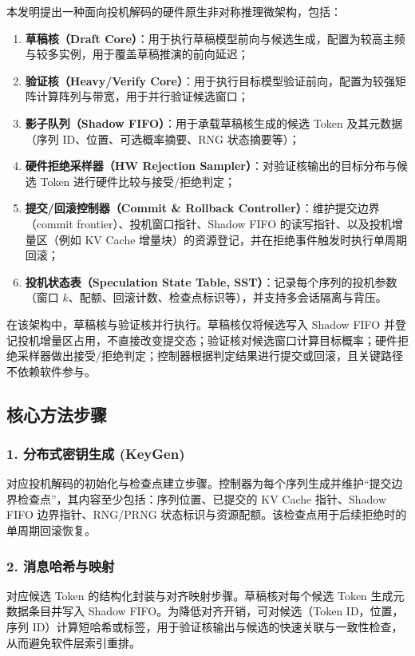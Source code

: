 \documentclass[12pt,a4paper]{article}
\begin{document}
本发明提出一种面向投机解码的硬件原生非对称推理微架构，包括：
\begin{enumerate}
    \item \textbf{草稿核（Draft Core）}：用于执行草稿模型前向与候选生成，配置为较高主频与较多实例，用于覆盖草稿推演的前向延迟；
    \item \textbf{验证核（Heavy/Verify Core）}：用于执行目标模型验证前向，配置为较强矩阵计算阵列与带宽，用于并行验证候选窗口；
    \item \textbf{影子队列（Shadow FIFO）}：用于承载草稿核生成的候选 Token 及其元数据（序列 ID、位置、可选概率摘要、RNG 状态摘要等）；
    \item \textbf{硬件拒绝采样器（HW Rejection Sampler）}：对验证核输出的目标分布与候选 Token 进行硬件比较与接受/拒绝判定；
    \item \textbf{提交/回滚控制器（Commit \& Rollback Controller）}：维护提交边界（commit frontier）、投机窗口指针、Shadow FIFO 的读写指针、以及投机增量区（例如 KV Cache 增量块）的资源登记，并在拒绝事件触发时执行单周期回滚；
    \item \textbf{投机状态表（Speculation State Table, SST）}：记录每个序列的投机参数（窗口 $k$、配额、回滚计数、检查点标识等），并支持多会话隔离与背压。
\end{enumerate}

在该架构中，草稿核与验证核并行执行。草稿核仅将候选写入 Shadow FIFO 并登记投机增量区占用，不直接改变提交态；验证核对候选窗口计算目标概率；硬件拒绝采样器做出接受/拒绝判定；控制器根据判定结果进行提交或回滚，且关键路径不依赖软件参与。

\subsection{核心方法步骤}

\subsubsection{1. 分布式密钥生成 (KeyGen)}

对应投机解码的初始化与检查点建立步骤。控制器为每个序列生成并维护“提交边界检查点”，其内容至少包括：序列位置、已提交的 KV Cache 指针、Shadow FIFO 边界指针、RNG/PRNG 状态标识与资源配额。该检查点用于后续拒绝时的单周期回滚恢复。

\subsubsection{2. 消息哈希与映射}

对应候选 Token 的结构化封装与对齐映射步骤。草稿核对每个候选 Token 生成元数据条目并写入 Shadow FIFO。为降低对齐开销，可对候选（Token ID，位置，序列 ID）计算短哈希或标签，用于验证核输出与候选的快速关联与一致性检查，从而避免软件层索引重排。
\end{document}
